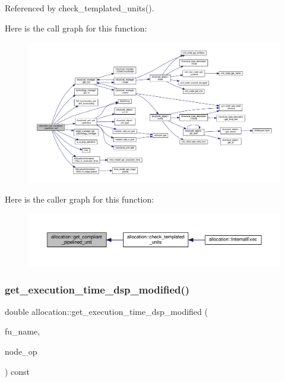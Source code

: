 Referenced by check\+\_\+templated\+\_\+units().

Here is the call graph for this function\+:
\nopagebreak
\begin{figure}[H]
\begin{center}
\leavevmode
\includegraphics[width=350pt]{d0/d74/classallocation_a0bac9cf0d8365c80a4868c63398f3cd8_cgraph}
\end{center}
\end{figure}
Here is the caller graph for this function\+:
\nopagebreak
\begin{figure}[H]
\begin{center}
\leavevmode
\includegraphics[width=350pt]{d0/d74/classallocation_a0bac9cf0d8365c80a4868c63398f3cd8_icgraph}
\end{center}
\end{figure}
\mbox{\label{classallocation_aa14fbc0eb589e643571db7f9338a5471}} 
\subsubsection{\texorpdfstring{get\+\_\+execution\+\_\+time\+\_\+dsp\+\_\+modified()}{get\_execution\_time\_dsp\_modified()}}
{\footnotesize\ttfamily double allocation\+::get\+\_\+execution\+\_\+time\+\_\+dsp\+\_\+modified (\begin{DoxyParamCaption}\item[{const unsigned int}]{fu\+\_\+name,  }\item[{const \hyperlink{technology__node_8hpp_a33dd193b7bd6b987bf0d8a770a819fa7}{technology\+\_\+node\+Ref} \&}]{node\+\_\+op }\end{DoxyParamCaption}) const\hspace{0.3cm}{\ttfamily [protected]}}

